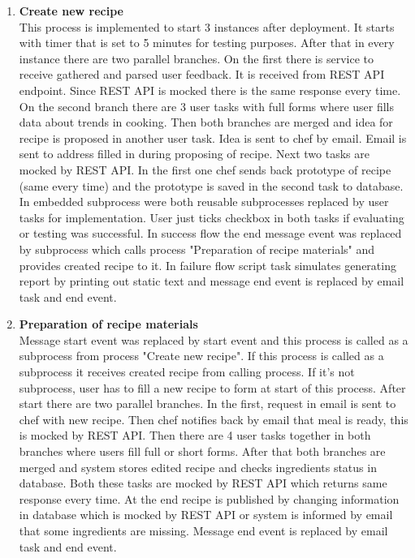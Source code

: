 \documentclass[11pt,a4paper]{article}
\begin{document}
\begin{enumerate}
    \item \textbf{Create new recipe}\\
    This process is implemented to start 3 instances after deployment. It starts with timer that is set to 5 minutes for testing purposes. After that in every instance there are two parallel branches. On the first there is service to receive gathered and parsed user feedback. It is received from REST API endpoint. Since REST API is mocked there is the same response every time. On the second branch there are 3 user tasks with full forms where user fills data about trends in cooking. Then both branches are merged and idea for recipe is proposed in another user task. Idea is sent to chef by email. Email is sent to address filled in during proposing of recipe. Next two tasks are mocked by REST API. In the first one chef sends back prototype of recipe (same every time) and the prototype is saved in the second task to database. In embedded subprocess were both reusable subprocesses replaced by user tasks for implementation. User just ticks checkbox in both tasks if evaluating or testing was successful. In success flow the end message event was replaced by subprocess which calls process "Preparation of recipe materials" and provides created recipe to it. In failure flow script task simulates generating report by printing out static text and message end event is replaced by email task and end event. 
    \item \textbf{Preparation of recipe materials}\\
    Message start event was replaced by start event and this process is called as a subprocess from process "Create new recipe". If this process is called as a subprocess it receives created recipe from calling process. If it's not subprocess, user has to fill a new recipe to form at start of this process. After start there are two parallel branches. In the first, request in email is sent to chef with new recipe. Then chef notifies back by email that meal is ready, this is mocked by REST API. Then there are 4 user tasks together in both branches where users fill full or short forms. After that both branches are merged and system stores edited recipe and checks ingredients status in database. Both these tasks are mocked by REST API which returns same response every time. At the end recipe is published by changing information in database which is mocked by REST API or system is informed by email that some ingredients are missing. Message end event is replaced by email task and end event.

\end{enumerate}
\end{document}
